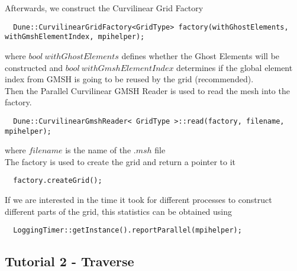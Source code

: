 \noindent
Afterwards, we construct the Curvilinear Grid Factory \\

\begin{mybox}
\begin{lstlisting}
  Dune::CurvilinearGridFactory<GridType> factory(withGhostElements, withGmshElementIndex, mpihelper);
\end{lstlisting}
\end{mybox}

\noindent
where $bool\ withGhostElements$ defines whether the Ghost Elements will be constructed and $bool\ withGmshElementIndex$ determines if the global element index from GMSH is going to be reused by the grid (recommended). \\

\noindent
Then the Parallel Curvilinear GMSH Reader is used to read the mesh into the factory. \\

\begin{mybox}
\begin{lstlisting}
  Dune::CurvilinearGmshReader< GridType >::read(factory, filename, mpihelper); 
\end{lstlisting}
\end{mybox}

\noindent
where $filename$ is the name of the $.msh$ file \\

\noindent
The factory is used to create the grid and return a pointer to it \\
\begin{mybox}
\begin{lstlisting}
  factory.createGrid();
\end{lstlisting}
\end{mybox}

If we are interested in the time it took for different processes to construct different parts of the grid, this statistics can be obtained using \\

\begin{mybox}
\begin{lstlisting}
  LoggingTimer::getInstance().reportParallel(mpihelper);
\end{lstlisting}
\end{mybox}



\subsection{Tutorial 2 - Traverse}
\label{usage-howto-tutorial-traverse}

